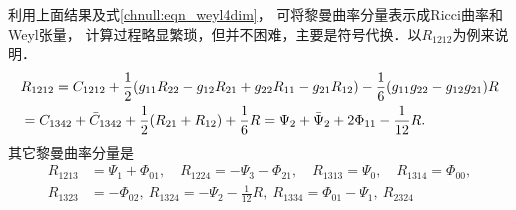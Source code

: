利用上面结果及式\eqref{chnull:eqn_weyl4dim}，
可将黎曼曲率分量表示成Ricci曲率和Weyl张量，
计算过程略显繁琐，但并不困难，主要是符号代换．以$R_{1212}$为例来说明．
\setlength{\mathindent}{0em}
    \begin{align}
        &R_{1212} = C_{1212} + \frac{1}{2}(g_{11}R_{22} - g_{12}R_{21} + g_{22}R_{11} - g_{21}R_{12})
        - \frac{1}{6}(g_{11}g_{22}-g_{12}g_{21}) R    \notag\\
        &=C_{1342} + \bar{C}_{1342}  + \frac{1}{2}(R_{21}  +R_{12})      + \frac{1}{6} R
        = \Psi_{2} + \bar{\Psi}_2 + 2\Phi_{11} -\frac{1}{12}R .
        \label{chnull:eqn_Riemann-by-Weyl-Ricc-R1212}
    \end{align}
其它黎曼曲率分量是
\begin{equation}\label{chnull:eqn_Riemann-by-Weyl-Ricc-all}
    \begin{aligned}
        R_{1213} %
        &= \Psi_{1} + \Phi_{01},      \quad
        R_{1224} %
        = -\Psi_{3} -\Phi_{21} ,  \quad
        R_{1313} %
        = \Psi_{0} ,  \quad
        R_{1314} %
        =  \Phi_{00}, \\
        R_{1323} %
        &= -\Phi_{02}  , \
        R_{1324} %
        = -\Psi_{2} - \frac{1}{12} R  ,   \
        R_{1334} %
        = \Phi_{01}-\Psi_{1}  , \
        R_{2324} %

\end{aligned}
\end{equation}
